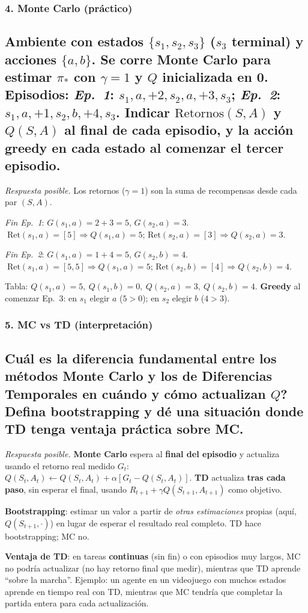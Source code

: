 \documentclass[11pt, a4paper]{article}
\newcommand{\pregunta}[1]{\subsection{#1}}
\newcommand{\eje}[1]{\subsubsection{#1}}
\begin{document}
\eje{4. Monte Carlo (pr\'actico)}
\pregunta{Ambiente con estados $\{s_1, s_2, s_3\}$ ($s_3$ terminal) y acciones $\{a,b\}$. Se corre Monte Carlo para estimar $\pi_*$ con $\gamma=1$ y $Q$ inicializada en 0. Episodios:
\emph{Ep.\ 1}: $s_1, a, {+}2, s_2, a, {+}3, s_3$; \quad \emph{Ep.\ 2}: $s_1, a, {+}1, s_2, b, {+}4, s_3$.
Indicar $\mathrm{Retornos}(S,A)$ y $Q(S,A)$ al final de cada episodio, y la acci\'on greedy en cada estado al comenzar el tercer episodio.}

\begin{respuesta}
\textit{Respuesta posible.} Los retornos ($\gamma=1$) son la suma de recompensas desde cada par $(S,A)$.

\emph{Fin Ep.\ 1}: $G(s_1,a)=2+3=5$, $G(s_2,a)=3$.
$\;\mathrm{Ret}(s_1,a)=[5]\Rightarrow Q(s_1,a)=5$;\; $\mathrm{Ret}(s_2,a)=[3]\Rightarrow Q(s_2,a)=3$.

\emph{Fin Ep.\ 2}: $G(s_1,a)=1+4=5$, $G(s_2,b)=4$.
$\;\mathrm{Ret}(s_1,a)=[5,5]\Rightarrow Q(s_1,a)=5$;\; $\mathrm{Ret}(s_2,b)=[4]\Rightarrow Q(s_2,b)=4$.

Tabla: $Q(s_1,a)=5,\ Q(s_1,b)=0,\ Q(s_2,a)=3,\ Q(s_2,b)=4$.
\textbf{Greedy} al comenzar Ep.\ 3: en $s_1$ elegir $a$ ($5>0$); en $s_2$ elegir $b$ ($4>3$).
\end{respuesta}

\eje{5. MC vs TD (interpretaci\'on)}
\pregunta{\textquestiondown Cu\'al es la diferencia fundamental entre los m\'etodos Monte Carlo y los de Diferencias Temporales en cu\'ando y c\'omo actualizan $Q$? Defina \textbf{bootstrapping} y d\'e una situaci\'on donde TD tenga ventaja pr\'actica sobre MC.}

\begin{respuesta}
\textit{Respuesta posible.} \textbf{Monte Carlo} espera al \textbf{final del episodio} y actualiza usando el retorno real medido $G_t$: $Q(S_t,A_t)\leftarrow Q(S_t,A_t)+\alpha[G_t - Q(S_t,A_t)]$. \textbf{TD} actualiza \textbf{tras cada paso}, sin esperar el final, usando $R_{t+1}+\gamma Q(S_{t+1},A_{t+1})$ como objetivo.

\textbf{Bootstrapping}: estimar un valor a partir de \emph{otras estimaciones} propias (aqu\'i, $Q(S_{t+1},\cdot)$) en lugar de esperar el resultado real completo. TD hace bootstrapping; MC no.

\textbf{Ventaja de TD}: en tareas \textbf{continuas} (sin fin) o con episodios muy largos, MC no podr\'ia actualizar (no hay retorno final que medir), mientras que TD aprende ``sobre la marcha''. Ejemplo: un agente en un videojuego con muchos estados aprende en tiempo real con TD, mientras que MC tendr\'ia que completar la partida entera para cada actualizaci\'on.
\end{respuesta}
\end{document}
